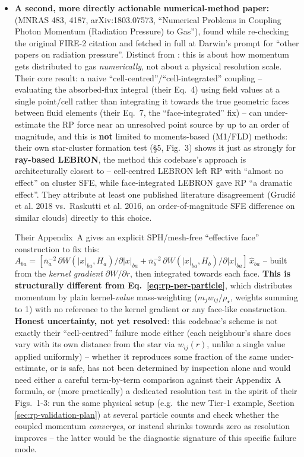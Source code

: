 \begin{itemize}
  \item \textbf{A second, more directly actionable numerical-method
    paper: \citet{HopkinsGrudic2019}} (MNRAS 483, 4187, arXiv:1803.07573,
    ``Numerical Problems in Coupling Photon Momentum (Radiation
    Pressure) to Gas''), found while re-checking the original FIRE-2
    citation and fetched in full at Darwin's prompt for ``other papers
    on radiation pressure''. Distinct from \citet{Krumholz2018}: this is
    about how momentum gets distributed to gas \emph{numerically}, not
    about a physical resolution scale. Their core result: a naive
    ``cell-centred''/``cell-integrated'' coupling -- evaluating the
    absorbed-flux integral (their Eq.~4) using field values at a single
    point/cell rather than integrating it towards the true geometric
    faces between fluid elements (their Eq.~7, the ``face-integrated''
    fix) -- can under-estimate the RP force near an unresolved point
    source by up to an order of magnitude, and this is \textbf{not}
    limited to moments-based (M1/FLD) methods: their own star-cluster
    formation test (\S5, Fig.~3) shows it just as strongly for
    \textbf{ray-based LEBRON}, the method this codebase's approach is
    architecturally closest to -- cell-centred LEBRON left RP with
    ``almost no effect'' on cluster SFE, while face-integrated LEBRON
    gave RP ``a dramatic effect''. They attribute at least one published
    literature disagreement (Grudi\'c et al. 2018 vs.\ Raskutti et al.
    2016, an order-of-magnitude SFE difference on similar clouds)
    directly to this choice.

    Their Appendix~A gives an explicit SPH/mesh-free ``effective face''
    construction to fix this:
    $A_{ba} = [\bar n_a^{-2}\,\partial W(|x|_{ba},H_a)/\partial|x|_{ba} +
    \bar n_b^{-2}\,\partial W(|x|_{ba},H_b)/\partial|x|_{ba}]\,\hat x_{ba}$
    -- built from the \emph{kernel gradient} $\partial W/\partial r$, then
    integrated towards each face. \textbf{This is structurally different
    from Eq.~\ref{eq:rp-per-particle}}, which distributes momentum by
    plain kernel-\emph{value} mass-weighting ($m_j w_{ij}/\rho_\star$,
    weights summing to 1) with no reference to the kernel gradient or
    any face-like construction. \textbf{Honest uncertainty, not yet
    resolved}: this codebase's scheme is not exactly their ``cell-centred''
    failure mode either (each neighbour's share does vary with its own
    distance from the star via $w_{ij}(r)$, unlike a single value applied
    uniformly) -- whether it reproduces some fraction of the same
    under-estimate, or is safe, has not been determined by inspection
    alone and would need either a careful term-by-term comparison against
    their Appendix~A formula, or (more practically) a dedicated
    resolution test in the spirit of their Figs.~1-3: run the same
    physical setup (e.g.\ the new Tier-1
     example, Section
    \ref{sec:rp-validation-plan}) at several particle counts and check
    whether the coupled momentum \emph{converges}, or instead shrinks
    towards zero as resolution improves -- the latter would be the
    diagnostic signature of this specific failure mode.


\end{itemize}
